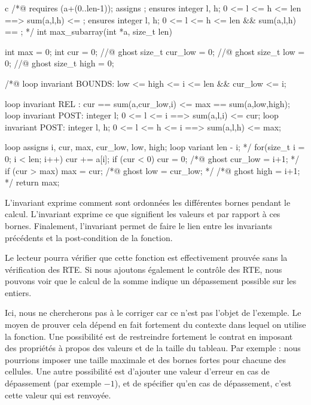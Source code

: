 \begin{CodeBlock}{c}
/*@ 
  requires \valid(a+(0..len-1));
  assigns \nothing;
  ensures \forall integer l, h;  0 <= l <= h <= len ==> sum(a,l,h) <= \result;
  ensures \exists integer l, h;  0 <= l <= h <= len &&  sum(a,l,h) == \result;
*/
int max_subarray(int *a, size_t len) {
  int max = 0;
  int cur = 0;
  //@ ghost size_t cur_low = 0; 
  //@ ghost size_t low = 0;
  //@ ghost size_t high = 0; 

  /*@ 
    loop invariant BOUNDS: low <= high <= i <= len && cur_low <= i;
    
    loop invariant REL :   cur == sum(a,cur_low,i) <= max == sum(a,low,high);
    loop invariant POST:   \forall integer l;    0 <= l <= i      ==> sum(a,l,i) <= cur;
    loop invariant POST:   \forall integer l, h; 0 <= l <= h <= i ==> sum(a,l,h) <= max;
   
    loop assigns i, cur, max, cur_low, low, high;
    loop variant len - i; 
  */
  for(size_t i = 0; i < len; i++) {
    cur += a[i];
    if (cur < 0) {
      cur = 0;
      /*@ ghost cur_low = i+1; */
    }
    if (cur > max) {
      max = cur;
      /*@ ghost low = cur_low; */
      /*@ ghost high = i+1; */
    }
  }
  return max;
}
\end{CodeBlock}



L'invariant  exprime comment sont ordonnées les différentes bornes 
pendant le calcul. L'invariant  exprime ce que signifient les 
valeurs  et  par rapport à ces bornes. Finalement, 
l'invariant  permet de faire le lien entre les invariants précédents 
et la post-condition de la fonction.



Le lecteur pourra vérifier que cette fonction est effectivement prouvée sans la
vérification des RTE. Si nous ajoutons également le contrôle des RTE, nous pouvons
voir que le calcul de la somme indique un dépassement possible sur les entiers.



Ici, nous ne chercherons pas à le corriger car ce n'est pas l'objet de l'exemple.
Le moyen de prouver cela dépend en fait fortement du contexte dans lequel on 
utilise la fonction. Une possibilité est de restreindre fortement le contrat en
imposant des propriétés à propos des valeurs et de la taille du tableau. Par 
exemple : nous pourrions imposer une taille maximale et des bornes fortes pour
chacune des cellules. Une autre possibilité est d'ajouter une valeur d'erreur
en cas de dépassement (par exemple $-1$), et de spécifier qu'en cas de 
dépassement, c'est cette valeur qui est renvoyée.
